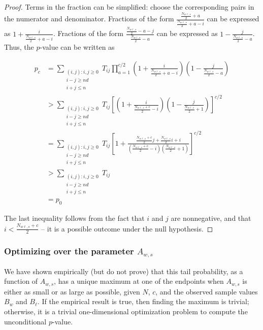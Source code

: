 \begin{proof}
Terms in the fraction can be simplified: choose the corresponding pairs in the numerator and denominator.
Fractions of the form $\frac{\frac{N_{w\ell, s}}{2} + a}{\frac{N_{w\ell,s}}{2} + a - i}$ can be expressed as $1 + \frac{i}{\frac{N_{w\ell,s}}{2} + a-i}$.
Fractions of the form $\frac{\frac{N_{w\ell, s}}{2}  - a - j}{\frac{N_{w\ell, s}}{2}  - a}$ can be expressed as $1 - \frac{j}{\frac{N_{w\ell, s}}{2} -a}$.
Thus, the $p$-value can be written as 

\begin{align*}
p_c &= \sum_{\substack{(i, j) :  i, j\ge 0 \\ i-j \geq nd \\ i+j \leq n}}T_{ij} \prod_{a=1}^{c/2} \left(1 + \frac{i}{\frac{N_{w\ell,s}}{2} + a-i}\right)\left(1 - \frac{j}{\frac{N_{w\ell, s}}{2} - a}\right) \\
&> \sum_{\substack{(i, j) :  i, j\ge 0 \\ i-j \geq nd \\ i+j \leq n}} T_{ij} \left[ \left(1 + \frac{i}{\frac{N_{w\ell,s}+c}{2} -i}\right)\left(1 - \frac{j}{\frac{N_{w\ell, s}}{2}+1}\right) \right]^{c/2} \\
&= \sum_{\substack{(i, j) :  i, j\ge 0 \\ i-j \geq nd \\ i+j \leq n}} T_{ij} \left[ 1 + \frac{\frac{N_{w\ell,s}+c}{2}j + \frac{N_{w\ell,s}}{2}i + i}{(\frac{N_{w\ell,s}+c}{2}-i)(\frac{N_{w\ell,s}}{2}+1)}\right]^{c/2} \\
&> \sum_{\substack{(i, j) :  i, j\ge 0 \\ i-j \geq nd \\ i+j \leq n}} T_{ij}\\
&= p_0
\end{align*}

The last inequality follows from the fact that $i$ and $j$ are nonnegative, and 
that $i < \frac{N_{w\ell,s}+c}{2}$ -- it is a possible outcome under the null hypothesis.




\end{proof}


\subsubsection{Optimizing over the parameter $A_{w,s}$}

We have shown empirically (but do not prove) that this tail probability, as a function of $A_{w,s}$,
has a unique maximum at one of the endpoints when $A_{w,s}$ is either as small or as large as possible,
given $N$, $c$, and the observed sample values $B_w$ and $B_\ell$.
If the empirical result is true, then finding the maximum is trivial;
otherwise, it is a trivial one-dimensional optimization problem to compute the unconditional $p$-value.

